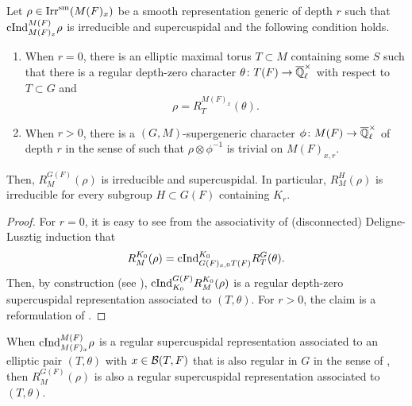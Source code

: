 \documentclass[12pt,reqno]{amsart}
\begin{document}
\begin{prop} \label{prop:transfer_regular_supercuspidal}
    Let $\rho \in {\operatorname{Irr}}^{\operatorname{sm}}(M(F)_x)$ be a smooth representation generic of depth $r$ such that ${\operatorname{cInd}}^{M(F)}_{M(F)_x} \rho$ is irreducible and supercuspidal and the following condition holds. 
    \begin{enumerate}
        \item When $r = 0$, there is an elliptic maximal torus $T \subset M$ containing some $S$ such that there is a regular depth-zero character $\theta \colon T(F) \to {\overline{\mathbb{Q}}_\ell^\times}$ with respect to $T \subset G$ and 
        \[
            \rho = R_T^{M(F)_x}(\theta). 
        \]
        \item When $r > 0$, there is a $(G, M)$-supergeneric character $\phi \colon M(F) \to {\overline{\mathbb{Q}}_\ell^\times}$ of depth $r$ in the sense of \cite[Definition 3.1]{Tak26_Yu} such that $\rho \otimes \phi^{-1}$ is trivial on $M(F)_{x, r}$. 
    \end{enumerate}
    Then, $R^{G(F)}_M(\rho)$ is irreducible and supercuspidal. In particular, $R_M^{H}(\rho)$ is irreducible for every subgroup $H \subset G(F)$ containing $K_r$. 
\end{prop}
\begin{proof}
    For $r = 0$, it is easy to see from the associativity of (disconnected) Deligne-Lusztig induction that
    \[
        R^{K_0}_M(\rho) = {\operatorname{cInd}}^{K_0}_{G(F)_{x, 0} T(F)} R_T^G(\theta). 
    \]
    Then, by construction (see \cite[Lemma 3.4.20]{Kal19}), ${\operatorname{cInd}}^{G(F)}_{K_0} R^{K_0}_M(\rho)$ is a regular depth-zero supercuspidal representation associated to $(T, \theta)$. For $r > 0$, the claim is a reformulation of \cite[Theorem 3.5]{Tak26_Yu}. 
\end{proof}

\begin{rmk}
    When ${\operatorname{cInd}}^{M(F)}_{M(F)_x} \rho$ is a regular supercuspidal representation associated to an elliptic pair $(T, \theta)$ with $x \in {\mathcal{B}}(T, F)$ that is also regular in $G$ in the sense of \cite{Kal19}, then $R_M^{G(F)}(\rho)$ is also a regular supercuspidal representation associated to $(T, \theta)$.
\end{rmk}

\end{document}
